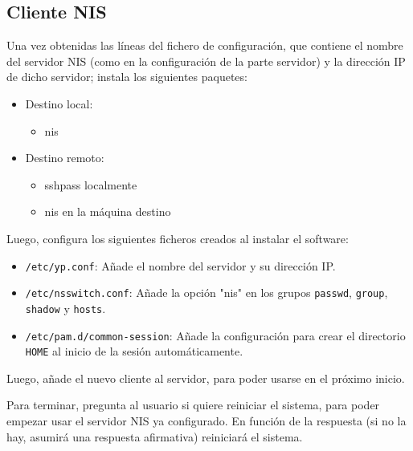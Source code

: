 \subsection{Cliente NIS}
Una vez obtenidas las líneas del fichero de configuración, que contiene el nombre del servidor NIS (como en la configuración de la parte servidor) y la dirección IP de dicho servidor; instala los siguientes paquetes:
\begin{itemize}
    \item Destino local:
    \begin{itemize}
        \item nis
    \end{itemize}
    \item Destino remoto:
    \begin{itemize}
        \item sshpass localmente
        \item nis en la máquina destino
    \end{itemize}
\end{itemize}

Luego, configura los siguientes ficheros creados al instalar el software\cite{nisclient}:
\begin{itemize}
    \item \texttt{/etc/yp.conf}: Añade el nombre del servidor y su dirección IP.
    \item \texttt{/etc/nsswitch.conf}: Añade la opción "nis" en los grupos \texttt{passwd}, \texttt{group}, \texttt{shadow} y \texttt{hosts}.
    \item \texttt{/etc/pam.d/common-session}: Añade la configuración para crear el directorio \texttt{HOME} al inicio de la sesión automáticamente.
\end{itemize}

Luego, añade el nuevo cliente al servidor, para poder usarse en el próximo inicio.

Para terminar, pregunta al usuario si quiere reiniciar el sistema, para poder empezar usar el servidor NIS ya configurado. En función de la respuesta (si no la hay, asumirá una respuesta afirmativa) reiniciará el sistema.